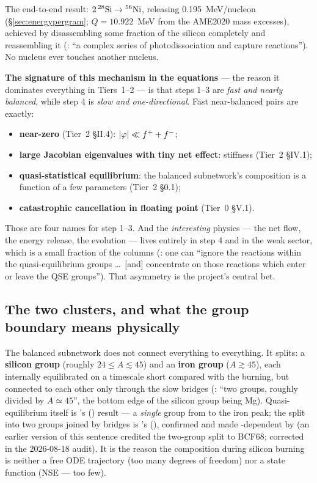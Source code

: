 The end-to-end result: $2\,\nuc{Si}{28} \to \nuc{Ni}{56}$, releasing
0.195~MeV/nucleon (\S\ref{sec:energypergram}; $Q = 10.922$~MeV from the AME2020
mass excesses), achieved by disassembling some fraction of the silicon
completely and reassembling it (\citealt{hix1996}: ``a complex series of
photodissociation and capture reactions''). No  nucleus ever
touches another  nucleus.

\textbf{The signature of this mechanism in the equations} --- the reason it
dominates everything in Tiers~1--2 --- is that steps 1--3 are \emph{fast and
nearly balanced}, while step 4 is \emph{slow and one-directional}. Fast
near-balanced pairs are exactly:

\begin{itemize}
\item \textbf{near-zero \kap} (Tier~2 \S II.4): $|\netflux| \ll \fp + \fm$;
\item \textbf{large Jacobian eigenvalues with tiny net effect}: stiffness
  (Tier~2 \S IV.1);
\item \textbf{quasi-statistical equilibrium}: the balanced subnetwork's
  composition is a function of a few parameters (Tier~2 \S 0.1);
\item \textbf{catastrophic cancellation in floating point} (Tier~0 \S V.1).
\end{itemize}

Those are four names for step 1--3. And the \emph{interesting} physics --- the
net flow, the energy release, the \Ye{} evolution --- lives entirely in step 4
and in the weak sector, which is a small fraction of the columns
(\citealt[\S 6]{hix1996}: one can ``ignore the reactions within the
quasi-equilibrium groups \ldots\ [and] concentrate on those reactions which
enter or leave the QSE groups''). That asymmetry is the project's central bet.

\subsection{The two clusters, and what the group boundary means physically}
\label{sec:twoclusters}

The balanced subnetwork does not connect everything to everything. It splits:
a \textbf{silicon group} (roughly $24 \le A \lesssim 45$) and an \textbf{iron
group} ($A \gtrsim 45$), each internally equilibrated on a timescale short
compared with the burning, but connected to each other only through the slow
bridges (\citealt[\S\S 4, 6.1]{hix1996}: ``two groups, roughly divided by
$A \simeq 45$'', the bottom edge of the silicon group being Mg).
Quasi-equilibrium itself is \citeauthor{bodansky1968}'s
(\citeyear{bodansky1968}) result --- a \emph{single} group from  to
the iron peak; the split into two groups joined by bridges is
\citeauthor{woosley1973}'s (\citeyear{woosley1973}), confirmed and made
\Ye-dependent by \citet{hix1996} (an earlier version of this sentence credited
the two-group split to BCF68; corrected in the 2026-08-18 audit). It is the
reason the composition during silicon burning is neither a free ODE trajectory
(too many degrees of freedom) nor a state function (NSE --- too few).

